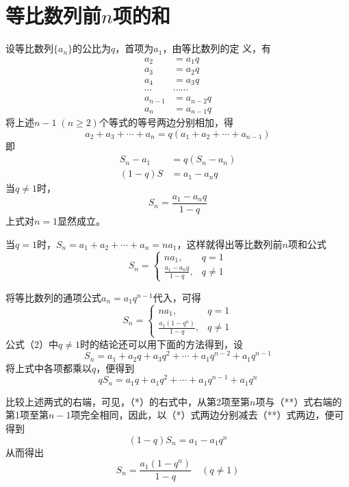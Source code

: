 \section{等比数列前$n$项的和}
设等比数列$\{a_n\}$的公比为$q$，首项为$a_1$，由等比数列的定
义，有
\[\begin{split}
    a_2&=a_1q\\
    a_3&=a_2q\\
    a_4&=a_3q\\
    \cdots&\cdots\cdots\\
    a_{n-1}&=a_{n-2}q\\
    a_n &=a_{n-1}q
\end{split}\]
将上述$n-1\; (n\ge 2)$个等式的等号两边分别相加，得
\[a_2+a_3+\cdots +a_n=q(a_1+a_2+\cdots +a_{n-1})\]
即
\[\begin{split}
S_n-a_1&=q(S_n-a_n)\\
(1-q)S&=a_1-a_nq     
\end{split}\]
当$q\ne 1$时，$$S_n=\frac{a_1-a_n q}{1-q}$$
上式对$n=1$显然成立。

当$q=1$时，$S_n=a_1+a_2+\cdots +a_n=na_1$，这样就得出等比数列前$n$项和公式
\begin{equation}
    S_n=\begin{cases}
        na_1,  & q=1\\[1.5ex]
        \frac{a_1-a_nq}{1-q},& q\ne 1
    \end{cases}\tag{1}
\end{equation}

将等比数列的通项公式$a_n=a_1q^{n-1}$代入，可得
\begin{equation}
    S_n=\begin{cases}
        na_1,  & q=1\\[1.5ex]
        \frac{a_1(1-q^n)}{1-q},& q\ne 1
    \end{cases}\tag{2}
\end{equation}
公式（2）中$q\ne 1$时的结论还可以用下面的方法得到，设
\begin{equation}
    S_n=a_1+a_2q+a_3q^2+\cdots+a_1q^{n-2}+a_1q^{n-1} \tag{*}
\end{equation}
将上式中各项都乘以$q$，便得到
\begin{equation}
  qS_n=a_1q+a_1q^2+\cdots+a_1q^{n-1}+a_1q^n \tag{**}  
\end{equation}

比较上述两式的右端，可见，（*）的右式中，从第2项至第$n$项与（**）式右端的第1项至第$n-1$项完全相同，因此，以（*）式两边分别减去（**）式两边，便可得到
\[(1-q)S_n=a_1-a_1q^n\]
从而得出
\[S_n=\frac{a_1(1-q^n)}{1-q}\quad (q\ne 1)\]

